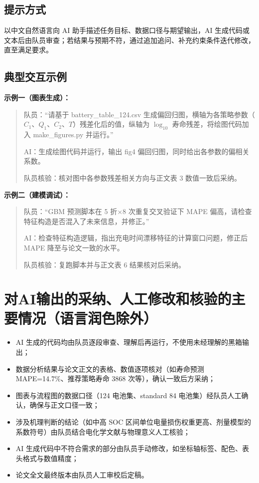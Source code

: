 \documentclass[UTF8]{ctexart}
\begin{document}
\subsection{提示方式}

以中文自然语言向 AI 助手描述任务目标、数据口径与期望输出，AI 生成代码或文本后由队员审查；若结果与预期不符，通过追加追问、补充约束条件迭代修改，直至满足要求。

\subsection{典型交互示例}

\textbf{示例一（图表生成）：}
\begin{quote}
队员：“请基于 battery\_table\_124.csv 生成偏回归图，横轴为各策略参数（$C_1$、$Q_1$、$C_2$、$T$）残差化后的值，纵轴为 $\log_{10}$ 寿命残差，将绘图代码加入 make\_figures.py 并运行。”

AI：生成绘图代码并运行，输出 fig4 偏回归图，同时给出各参数的偏相关系数。

队员核验：核对图中各参数残差相关方向与正文表 3 数值一致后采纳。
\end{quote}

\textbf{示例二（建模调试）：}
\begin{quote}
队员：“GBM 预测脚本在 5 折$\times$8 次重复交叉验证下 MAPE 偏高，请检查特征构造是否混入了未来信息，并修正。”

AI：检查特征构造逻辑，指出充电时间漂移特征的计算窗口问题，修正后 MAPE 降至与论文一致的水平。

队员核验：复跑脚本并与正文表 6 结果核对后采纳。
\end{quote}

\section{对AI输出的采纳、人工修改和核验的主要情况（语言润色除外）}

\begin{itemize}[leftmargin=1.6em,itemsep=2pt]
  \item AI 生成的代码均由队员逐段审查、理解后再运行，不使用未经理解的黑箱输出；
  \item 数据分析结果与论文正文的表格、数值逐项核对（如寿命预测 MAPE=14.7\%、推荐策略寿命 3868 次等），确认一致后方采纳；
  \item 图表与流程图的数据口径（124 电池集、standard 84 电池集）经队员人工确认，确保与正文口径一致；
  \item 涉及机理判断的结论（如中高 SOC 区间单位电量损伤权重更高、剂量模型的系数符号）由队员结合电化学文献与物理意义人工核验；
  \item AI 生成代码中不符合需求的部分由队员手动修改，如坐标轴标签、配色、表头格式与数值精度；
  \item 论文全文最终版本由队员人工审校后定稿。
\end{itemize}
\end{document}
